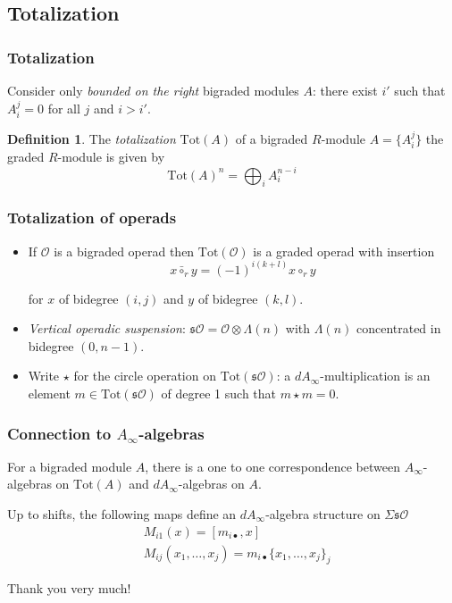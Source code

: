 \documentclass{beamer}
\theoremstyle{definition}
\newtheorem{defi}{Definition}
\newcommand{\OO}{\mathcal{O}}
\newcommand{\Tot}{\mathrm{Tot}}
\newcommand{\s}{\mathfrak{s}}
\begin{document}
\subsection{Totalization}
\begin{frame}
\frametitle{Totalization}
Consider only \emph{bounded on the right} bigraded modules $A$: there exist $i'$ such that $A_i^j=0$ for all $j$ and $i>i'$.\pause %
\begin{defi}
The \emph{totalization} $\Tot(A)$ of a bigraded $R$-module $A = \{A^j_i \}$ the graded $R$-module is given by
\[\Tot(A)^n =
\bigoplus_{i}A^{n-i}_i \]%
\end{defi}
\end{frame}
\begin{frame}
\frametitle{Totalization of operads}
\begin{itemize}
\item<1-> If $\OO$ is a bigraded operad then $\Tot(\OO)$ is a graded operad with insertion
\[x\bar{\circ}_ry=(-1)^{i(k+l)} x\circ_r y\]

for $x$ of bidegree $(i,j)$ and $y$ of bidegree $(k,l)$.
\item<2-> \emph{Vertical operadic suspension}: $\mathfrak{s}\OO = \OO\otimes \Lambda(n)$ with $\Lambda(n)$ concentrated in bidegree $(0,n-1)$.
\item<3-> Write $\star$ for the circle operation on $\Tot(\s\OO)$: a $dA_\infty$-multiplication is an element $m\in\Tot(\s\OO)$ of degree 1 such that $m\star m = 0$.
\end{itemize}
\end{frame}
\begin{frame}
\frametitle{Connection to $A_\infty$-algebras}
\begin{theorem}
For a bigraded module $A$, there is a one to one correspondence between $A_\infty$-algebras on $\Tot(A)$ and $dA_\infty$-algebras on $A$.
\end{theorem}\pause
\begin{corollary}
Up to shifts, the following maps define an $dA_\infty$-algebra structure on $\Sigma\mathfrak{s}\mathcal{O}$
\begin{align*}
&M_{i1}(x)=[m_{i\bullet},x]\\
&M_{ij}(x_1,\dots, x_j)=m_{i\bullet}\{x_1,\dots, x_j\}_j
\end{align*}
\end{corollary}

\end{frame}

\begin{frame}
\begin{center}
\Huge{Thank you very much!}
\end{center}
\end{frame}
\end{document}
